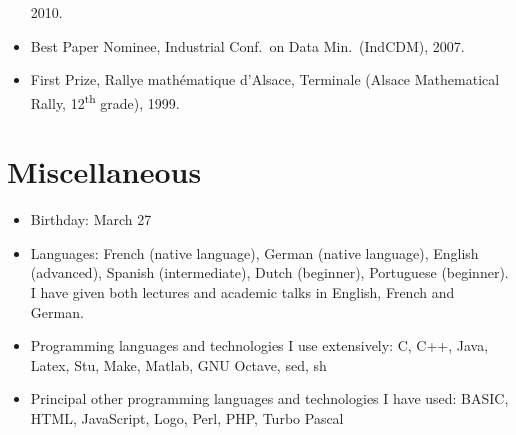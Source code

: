 \documentclass[line,mm]{res}
\newcounter{x}
\newcounter{y}
\begin{document}
\begin{resume}
\begin{itemize}
    2010.  
  \item 
    Best Paper Nominee, Industrial Conf.\ on Data Min.\ (IndCDM), 2007.    
  \item 
    First Prize, Rallye mathématique d'Alsace, Terminale (Alsace
    Mathematical Rally, 12\textsuperscript{th} grade), 1999. 
\end{itemize}

\section{Miscellaneous}
\begin{itemize}
  \item Birthday:  March 27
  \item Languages: French (native language), German (native language),
    English (advanced), Spanish (intermediate), Dutch (beginner), Portuguese
    (beginner).  I have given both lectures and academic talks in English, French and German. 
  \item Programming languages and technologies I use extensively:
    C, C++, Java, Latex, Stu, Make, Matlab, GNU Octave, sed, sh
  \item Principal other programming languages and technologies I have used:
    BASIC, HTML, JavaScript, Logo, Perl, PHP, Turbo Pascal 
\end{itemize}

\end{resume}
\end{document}
